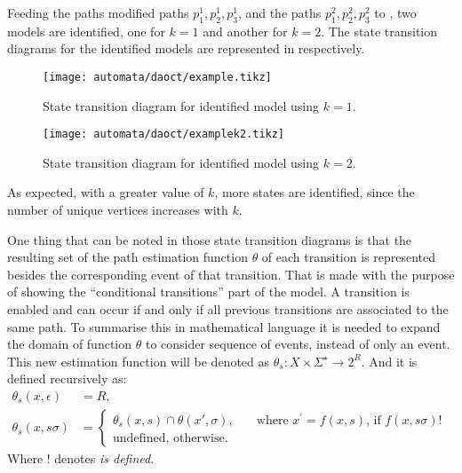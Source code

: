 \vspace{1cm}

Feeding the paths modified paths $p_1^1,p_2^1,p_3^1$,
and the paths $p_1^2,p_2^2,p_3^2$ to , two models are identified, one for $k=1$ and another for
$k=2$.
The state transition diagrams for the identified models are represented in  respectively. 

\begin{figure}[H]
  \centering \texttt{[image: automata/daoct/example.tikz]}
  \caption{State transition diagram for identified model using $k=1$.}
  \label{fig:examplek1}
\end{figure}


\begin{figure}[H]
  \centering \texttt{[image: automata/daoct/examplek2.tikz]}
  \caption{State transition diagram for identified model using $k=2$.}
  \label{fig:examplek2}
\end{figure}

As expected, with a greater value of $k$, more states are identified, since the
number of unique vertices increases with $k$.

One thing that can be noted in those state transition diagrams is that the
resulting set
of the path estimation function $\theta$ of each transition is represented
besides the corresponding event of that transition. That is made with the
purpose of showing the ``conditional transitions'' part of the \DAOCT{} model. A
transition is enabled and can occur if and only if all previous transitions are
associated to the same path. To summarise this in mathematical language it is
needed to expand the domain of function $\theta$ to consider sequence of events,
instead of only an event. This new estimation function will be denoted as
$\theta_s : X \times \Sigma^\star \rightarrow 2^R$. And it is defined
recursively as:
\begin{align}
  \theta_s(x,\epsilon)&=R,\nonumber\\
  \theta_s(x,s\sigma)&=
                       \begin{cases}
                         \theta_s(x,s) \cap \theta(x',\sigma),       & \quad \text{where $x^\prime = f(x,s)$, if $f(x,s\sigma)!$ }\\
                         \text{undefined, otherwise.}  &
                       \end{cases}
\end{align}
Where ! denotes \emph{is defined}.

